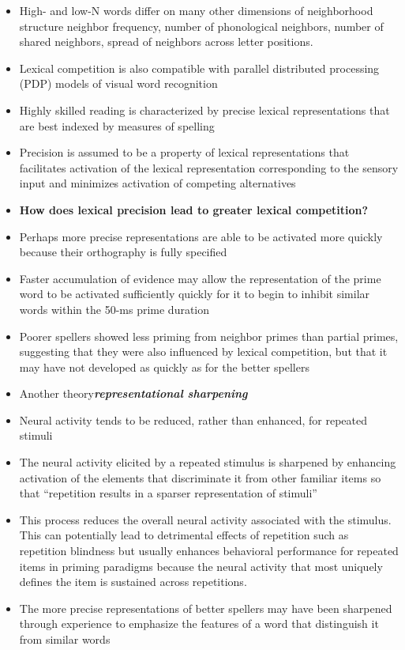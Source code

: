 \documentclass[]{article}
\begin{document}
{\begin{itemize}
			\item High- and low-N words differ on many other dimensions of neighborhood structure \textemdash neighbor frequency, number of phonological neighbors, number of shared neighbors, spread of neighbors across letter positions.
			\item Lexical competition is also compatible with parallel distributed processing (PDP) models of visual word recognition
			\item Highly skilled reading is characterized by precise lexical representations that are best indexed by measures of spelling
			\item Precision is assumed to be a property of lexical representations that facilitates activation of the lexical representation corresponding to the sensory input and minimizes activation of competing alternatives
			\item \textbf{How does lexical precision lead to greater lexical competition?}
			\item Perhaps more precise representations are able to be activated more quickly because their orthography is fully specified
			\item Faster accumulation of evidence may allow the representation of the prime word to be activated sufficiently quickly for it to begin to inhibit similar words within the 50-ms prime duration
			\item Poorer spellers showed less priming from neighbor primes than partial primes, suggesting that they were also influenced by lexical competition, but that it may have not developed as quickly as for the better spellers
			\item Another theory\textemdash \textbf{\textit{representational sharpening}}
			\item Neural activity tends to be reduced, rather than enhanced, for repeated stimuli
			\item The neural activity elicited by a repeated stimulus is sharpened by enhancing activation of the elements that discriminate it from other familiar items so that “repetition results in a sparser representation of stimuli”
			\item This process reduces the overall neural activity associated 	with the stimulus. This can potentially lead to detrimental effects of repetition such as repetition blindness but usually enhances behavioral performance for repeated items in priming paradigms because the neural activity that most uniquely defines the item is sustained across repetitions.
			\item The more precise representations of better spellers may have been sharpened through experience to emphasize the features of a word that distinguish it from similar words

\end{itemize}}
\end{document}
